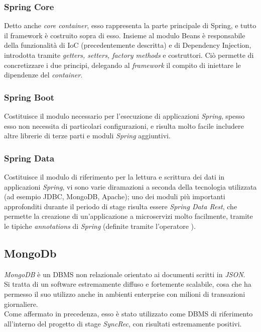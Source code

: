 \subsubsection{Spring Core}
Detto anche \textit{core container}, esso rappresenta la parte principale di Spring, e tutto il framework è costruito sopra di esso.
Insieme al modulo Beans è responsabile della funzionalità di IoC (precedentemente descritta) e  di Dependency Injection, introdotta tramite \textit{getters, setters, factory methods} e costruttori.
Ciò permette di concretizzare i due principi, delegando al \textit{framework} il compito di iniettare le dipendenze del \textit{container}.

\subsubsection{Spring Boot}
Costituisce il modulo necessario per l'esecuzione di applicazioni \textit{Spring}, spesso esso non necessita di particolari configurazioni, e risulta molto facile includere altre librerie di terze parti e moduli \textit{Spring} aggiuntivi.\\

\subsubsection{Spring Data}
Costituisce il modulo di riferimento per la lettura e scrittura dei dati in applicazioni \textit{Spring}, vi sono varie diramazioni 	a seconda della tecnologia utilizzata (ad esempio JDBC, MongoDB, Apache); uno dei moduli più importanti approfonditi durante il periodo di stage risulta essere \textit{Spring Data Rest}, che permette la creazione di un'applicazione a microservizi molto facilmente, tramite le tipiche \textit{annotations} di \textit{Spring} (definite tramite l'operatore \@).


\subsection{MongoDb}
\textit{MongoDB} è un \gls{DBMS} non relazionale orientato ai documenti scritti in \textit{JSON}.\\
Si tratta di un software estremamente diffuso e fortemente scalabile, cosa che ha permesso il suo utilizzo anche in ambienti enterprise con milioni di transazioni giornaliere.\\
Come affermato in precedenza, esso è stato utilizzato come DBMS di riferimento all'interno del progetto di stage \textit{SyncRec}, con risultati estremamente positivi.


